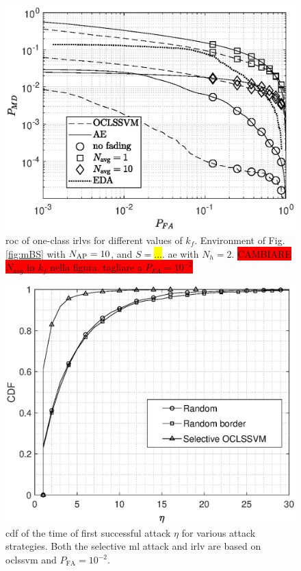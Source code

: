 \documentclass[draftcls,onecolumn,12pt]{IEEEtran}
\begin{document}
{\begin{figure}[t]
    \centering
    \includegraphics[width=0.6\columnwidth]{res_Fading_10BS_oneClass.eps}
    \caption{\ac{roc} of one-class \acp{irlv} for different values of $k_f$. Environment of Fig. \ref{fig:mBS} with $N_{\rm AP}=10$, and $S=$\hl{...}.  \ac{ae} with $N_h = 2$. \colorbox{red}{CAMBIARE $N_{avg}$ in $k_f$ nella figura. tagliare a $P_{FA} = 10^{-2}$} }
    \label{fig:kf10Oc}
\end{figure}




\begin{figure}[t]
    \centering
    \includegraphics[width=0.6\columnwidth]{res_selective_SVM.eps}
    \caption{\ac{cdf} of the time of first successful attack $\eta$ for various attack strategies. Both the selective \ac{ml} attack  and \ac{irlv} are based on \ac{oclssvm} and $P_{\text{FA}}= 10^{-2}$.}
    \label{fig:selectiveSVM}
\end{figure}

}
\end{document}
